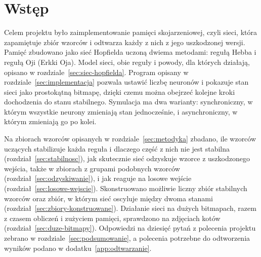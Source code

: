 \section{Wstęp}
\label{sec:wstep}

Celem projektu było zaimplementowanie pamięci skojarzeniowej, czyli sieci, która zapamiętuje zbiór wzorców i odtwarza każdy z nich z jego uszkodzonej wersji. Pamięć zbudowano jako sieć Hopfielda uczoną dwiema metodami: regułą Hebba i regułą Oji (Erkki Oja). Model sieci, obie reguły i powody, dla których działają, opisano w rozdziale~\ref{sec:siec-hopfielda}. Program opisany w rozdziale~\ref{sec:implementacja} pozwala ustawić liczbę neuronów i pokazuje stan sieci jako prostokątną bitmapę, dzięki czemu można obejrzeć kolejne kroki dochodzenia do stanu stabilnego. Symulacja ma dwa warianty: synchroniczny, w którym wszystkie neurony zmieniają stan jednocześnie, i asynchroniczny, w którym zmieniają go po kolei.

Na zbiorach wzorców opisanych w rozdziale~\ref{sec:metodyka} zbadano, ile wzorców uczących stabilizuje każda reguła i dlaczego część z nich nie jest stabilna (rozdział~\ref{sec:stabilnosc}), jak skutecznie sieć odzyskuje wzorce z uszkodzonego wejścia, także w zbiorach z grupami podobnych wzorców (rozdział~\ref{sec:odzyskiwanie}), i jak reaguje na losowe wejście (rozdział~\ref{sec:losowe-wejscie}). Skonstruowano możliwie liczny zbiór stabilnych wzorców oraz zbiór, w którym sieć oscyluje między dwoma stanami (rozdział~\ref{sec:zbiory-konstruowane}). Działanie sieci na dużych bitmapach, razem z czasem obliczeń i zużyciem pamięci, sprawdzono na zdjęciach kotów (rozdział~\ref{sec:duze-bitmapy}). Odpowiedzi na dziesięć pytań z polecenia projektu zebrano w rozdziale~\ref{sec:podsumowanie}, a polecenia potrzebne do odtworzenia wyników podano w dodatku~\ref{app:odtwarzanie}.
